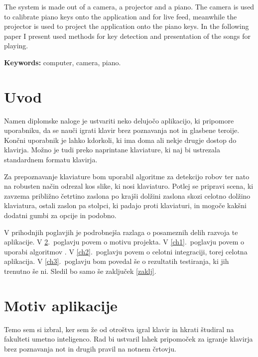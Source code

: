 \documentclass[a4paper,12pt,openright]{book}
\newcommand{\tkeywordsEn}{computer, camera, piano}
\newcommand{\clearemptydoublepage}{\newpage{\pagestyle{empty}\cleardoublepage}}
\begin{document}
The system is made out of a camera, a projector and a piano. The camera is used to calibrate piano keys onto the application and for live feed, meanwhile the projector is used to project the application onto the piano keys. In the following paper I present used methods for key detection and presentation of the songs for playing. 

\bigskip

\noindent\textbf{Keywords:} \tkeywordsEn.
\clearemptydoublepage

\mainmatter
\setcounter{page}{1}
\pagestyle{fancy}

\chapter{Uvod}

Namen diplomske naloge je ustvariti neko delujočo aplikacijo, ki pripomore uporabniku, da se nauči igrati klavir brez poznavanja not in glasbene teroije. Končni uporabnik je lahko kdorkoli, ki ima doma ali nekje drugje dostop do klavirja. Možno je tudi preko naprintane klaviature, ki naj bi ustrezala standardnem formatu klavirja.

Za prepoznavanje klaviature bom uporabil algoritme za detekcijo robov ter nato na robusten način odrezal kos slike, ki nosi klaviaturo. Potlej se pripravi scena, ki zavzema približno četrtino zaslona po krajši dolžini zaslona skozi celotno dolžino klaviatura, ostali zaslon pa stolpci, ki padajo proti klaviaturi, in mogoče kakšni dodatni gumbi za opcije in podobno.

V prihodnjih poglavjih je podrobnejša razlaga o posameznih delih razvoja te aplikacije.
V \ref{ch0}.~poglavju povem o motivu projekta.
V \ref{ch1}.~poglavju povem o uporabi algoritmov .
V \ref{ch2}.~poglavju povem o celotni integraciji, torej celotna aplikacija.
V \ref{ch3}.~poglavju bom povedal še o rezultatih testiranja, ki jih trenutno še ni.
Sledil bo samo še zaključek \ref{zaklj}.


\chapter{Motiv aplikacije}
\label{ch0}

Temo sem si izbral, ker sem že od otroštva igral klavir in hkrati študiral na fakulteti umetno inteligenco. Rad bi ustvaril lahek pripomoček za igranje klavirja brez poznavanja not in drugih pravil na notnem črtovju.
\end{document}
